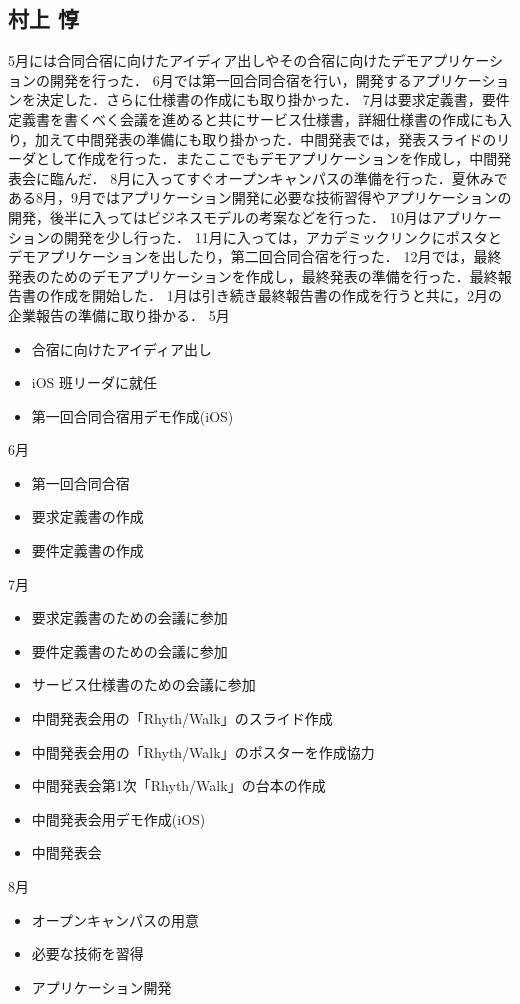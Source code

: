 \subsection{村上 惇}
\par
5月には合同合宿に向けたアイディア出しやその合宿に向けたデモアプリケーションの開発を行った．
6月では第一回合同合宿を行い，開発するアプリケーションを決定した．さらに仕様書の作成にも取り掛かった．
7月は要求定義書，要件定義書を書くべく会議を進めると共にサービス仕様書，詳細仕様書の作成にも入り，加えて中間発表の準備にも取り掛かった．中間発表では，発表スライドのリーダとして作成を行った．またここでもデモアプリケーションを作成し，中間発表会に臨んだ．
8月に入ってすぐオープンキャンパスの準備を行った．夏休みである8月，9月ではアプリケーション開発に必要な技術習得やアプリケーションの開発，後半に入ってはビジネスモデルの考案などを行った．
10月はアプリケーションの開発を少し行った．
11月に入っては，アカデミックリンクにポスタとデモアプリケーションを出したり，第二回合同合宿を行った．
12月では，最終発表のためのデモアプリケーションを作成し，最終発表の準備を行った．最終報告書の作成を開始した．
1月は引き続き最終報告書の作成を行うと共に，2月の企業報告の準備に取り掛かる．
5月
\begin{itemize}
\item 合宿に向けたアイディア出し
\item iOS 班リーダに就任
\item 第一回合同合宿用デモ作成(iOS)
\end{itemize}
6月
\begin{itemize}
\item 第一回合同合宿
\item 要求定義書の作成		　
\item 要件定義書の作成
\end{itemize}
7月
\begin{itemize}
\item 要求定義書のための会議に参加
\item 要件定義書のための会議に参加
\item サービス仕様書のための会議に参加
\item 中間発表会用の「Rhyth/Walk」のスライド作成
\item 中間発表会用の「Rhyth/Walk」のポスターを作成協力
\item 中間発表会第1次「Rhyth/Walk」の台本の作成
\item 中間発表会用デモ作成(iOS)
\item 中間発表会
\end{itemize}
8月
\begin{itemize}
\item オープンキャンパスの用意
\item 必要な技術を習得
\item アプリケーション開発
\end{itemize}
